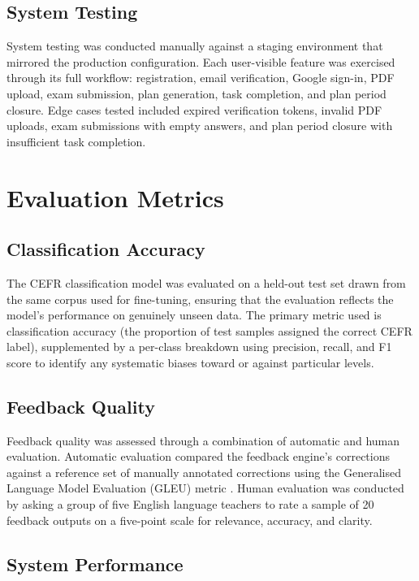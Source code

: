 \documentclass[12pt, a4paper]{report}
\begin{document}
\subsection{System Testing}

System testing was conducted manually against a staging environment that mirrored the production configuration. Each user-visible feature was exercised through its full workflow: registration, email verification, Google sign-in, PDF upload, exam submission, plan generation, task completion, and plan period closure. Edge cases tested included expired verification tokens, invalid PDF uploads, exam submissions with empty answers, and plan period closure with insufficient task completion.

\section{Evaluation Metrics}

\subsection{Classification Accuracy}

The CEFR classification model was evaluated on a held-out test set drawn from the same corpus used for fine-tuning, ensuring that the evaluation reflects the model's performance on genuinely unseen data. The primary metric used is classification accuracy (the proportion of test samples assigned the correct CEFR label), supplemented by a per-class breakdown using precision, recall, and F1 score to identify any systematic biases toward or against particular levels.

\subsection{Feedback Quality}

Feedback quality was assessed through a combination of automatic and human evaluation. Automatic evaluation compared the feedback engine's corrections against a reference set of manually annotated corrections using the Generalised Language Model Evaluation (GLEU) metric \cite{napoles2015}. Human evaluation was conducted by asking a group of five English language teachers to rate a sample of 20 feedback outputs on a five-point scale for relevance, accuracy, and clarity.

\subsection{System Performance}
\end{document}
